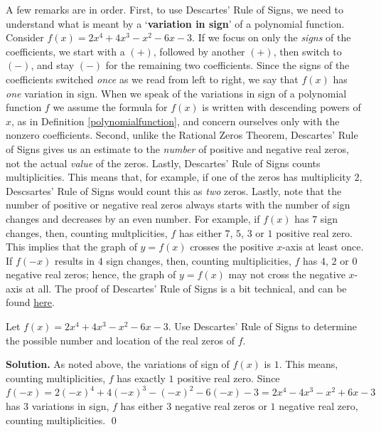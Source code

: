 A few remarks are in order. First, to use Descartes' Rule of Signs, we need to understand what is meant by a `\textbf{variation in sign}' of a polynomial function.  Consider $f(x) = 2x^4+4x^3-x^2-6x-3$.  If we focus on only the \textit{signs} of the coefficients, we start with a $(+)$, followed by another $(+)$, then switch to $(-)$, and stay $(-)$ for the remaining two coefficients.  Since the signs of the coefficients switched \textit{once} as we read from left to right, we say that $f(x)$ has \textit{one} variation in sign.  When we speak of the variations in sign of a polynomial function $f$ we assume the formula for $f(x)$ is written with descending powers of $x$, as in Definition \ref{polynomialfunction}, and concern ourselves only with the nonzero coefficients.  Second, unlike the Rational Zeros Theorem, Descartes' Rule of Signs gives us an estimate to the \textit{number} of positive and negative real zeros, not the actual \textit{value} of the zeros. Lastly, Descartes' Rule of Signs counts multiplicities.  This means that, for example, if one of the zeros has multiplicity $2$, Descsartes' Rule of Signs would count this as \textit{two} zeros.  Lastly, note that the number of positive or negative real zeros always starts with the number of sign changes and decreases by an even number.  For example, if $f(x)$ has $7$ sign changes, then, counting multplicities, $f$ has either $7$, $5$, $3$ or $1$ positive real zero.  This implies that the graph of $y=f(x)$ crosses the positive $x$-axis at least once.  If $f(-x)$ results in $4$ sign changes, then, counting multiplicities, $f$ has $4$, $2$ or $0$ negative real zeros;  hence, the graph of $y=f(x)$ may not cross the negative $x$-axis at all.  The proof of Descartes' Rule of Signs is a bit technical, and can be found \href{http://www.cut-the-knot.org/fta/ROS2.shtml}{\underline{here}}. 

\begin{ex}  Let $f(x) = 2x^4+4x^3-x^2-6x-3$.  Use Descartes' Rule of Signs to determine the possible number and location of the real zeros of $f$.

\smallskip

{\bf Solution.}  As noted above, the variations of sign of $f(x)$ is $1$. This means, counting multiplicities, $f$ has exactly $1$ positive real zero.  Since $f(-x)=2(-x)^4+4(-x)^3-(-x)^2-6(-x)-3=2x^4-4x^3-x^2+6x-3$ has $3$ variations in sign, $f$ has either $3$ negative real zeros or $1$ negative real zero, counting multiplicities. \qed

\label{DRSex}

\end{ex}

